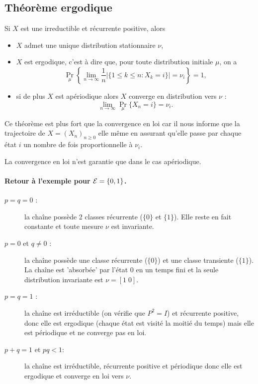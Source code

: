 \subsection{Théorème ergodique}  

\begin{theorem*}
  Si $X$ est une \cM irreductible et récurrente positive, alors 
  \begin{itemize}
   \item $X$ admet une unique distribution stationnaire $\nu$,
   \item $X$ est ergodique, c'est à dire que, pour toute distribution initiale $\mu$, on a
   $$
   \Pr_\mu\left\{\lim_{n \rightarrow \infty} \frac1n \left|\{1 \leq k \leq n: X_k = i\}\right| = \nu_i\right\} = 1,
   $$
   \item si de plus $X$ est apériodique alors $X$ converge en distribution vers $\nu$ : 
   $$
   \lim_{n \rightarrow \infty} \Pr_\mu\{X_n = i\} = \nu_i.
   $$
  \end{itemize}
\end{theorem*}

\remark
Ce théorème est plus fort que la convergence en loi car il nous informe que la trajectoire de $X = (X_n)_{n \geq 0}$ elle même en assurant qu'elle passe par chaque état $i$ un nombre de fois proportionnelle à $\nu_i$.

\remark
La convergence en loi n'est garantie que dans le cas apériodique.

\paragraph{Retour à l'exemple pour $\mathcal{E} = \{0, 1\}$.}
\begin{description}
  \item[$p = q = 0$ :] la chaîne possède 2 classes récurrente ($\{0\}$ et $\{1\}$). Elle reste en fait constante et toute mesure $\nu$ est invariante.
  \item[$p = 0$ et $q \neq 0$ :] la chaîne possède une classe récurrente ($\{0\}$) et une classe transiente ($\{1\}$). La chaîne est 'absorbée' par l'état $0$ en un temps fini et la seule distribution invariante est $\nu = [1 \; 0]$.
  \item[$p = q = 1$ :] la chaîne est irréductible (on vérifie que $P^2 = I$) et récurrente positive, donc elle est ergodique (chaque état est visité la moitié du temps) mais elle est périodique et ne converge pas en loi.
  \item[$p + q = 1$ et $pq < 1$:] la chaîne est irréductible, récurrente positive et périodique donc elle est ergodique et converge en loi vers $\nu$.
\end{description}

